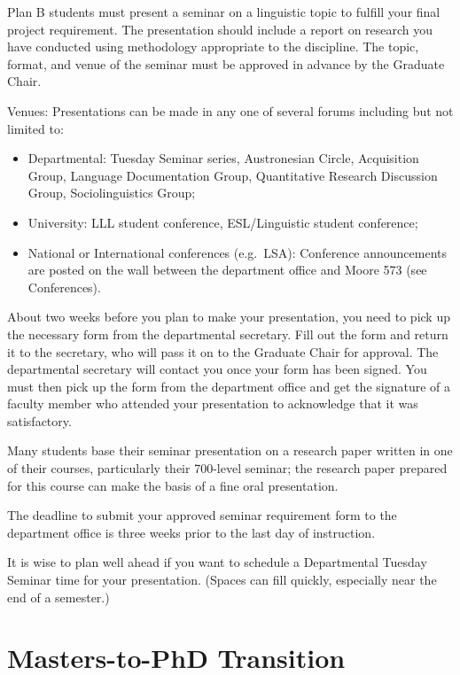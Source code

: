 \documentclass[
]{book}
\providecommand{\tightlist}{%
  \setlength{\itemsep}{0pt}\setlength{\parskip}{0pt}}
\begin{document}
Plan B students must present a seminar on a linguistic topic to fulfill your final project requirement. The presentation should include a report on research you have conducted using methodology appropriate to the discipline. The topic, format, and venue of the seminar must be approved in advance by the Graduate Chair.

Venues: Presentations can be made in any one of several forums including but not limited to:

\begin{itemize}
\tightlist
\item
  Departmental: Tuesday Seminar series, Austronesian Circle, Acquisition Group, Language Documentation Group, Quantitative Research Discussion Group, Sociolinguistics Group;
\item
  University: LLL student conference, ESL/Linguistic student conference;
\item
  National or International conferences (e.g.~LSA): Conference announcements are posted on the wall between the department office and Moore 573 (see Conferences).
\end{itemize}

About two weeks before you plan to make your presentation, you need to pick up the necessary form from the departmental secretary. Fill out the form and return it to the secretary, who will pass it on to the Graduate Chair for approval. The departmental secretary will contact you once your form has been signed. You must then pick up the form from the department office and get the signature of a faculty member who attended your presentation to acknowledge that it was satisfactory.

Many students base their seminar presentation on a research paper written in one of their courses, particularly their 700-level seminar; the research paper prepared for this course can make the basis of a fine oral presentation.

The deadline to submit your approved seminar requirement form to the department office is three weeks prior to the last day of instruction.

It is wise to plan well ahead if you want to schedule a Departmental Tuesday Seminar time for your presentation. (Spaces can fill quickly, especially near the end of a semester.)

\chapter{Masters-to-PhD Transition}\label{masters-to-phd-transition}
\end{document}

